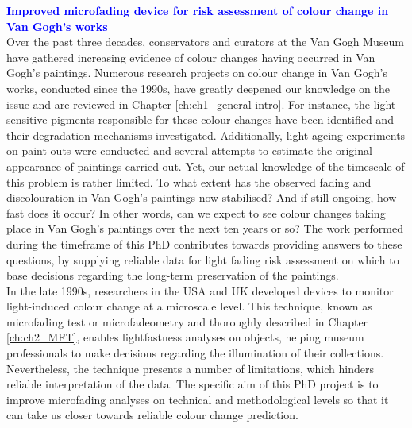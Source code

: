 


\textbf{\textcolor{blue}{Improved microfading device for risk assessment of colour change in Van Gogh's works}}\\

Over the past three decades, conservators and curators at the Van Gogh Museum have gathered increasing evidence of colour changes having occurred in Van Gogh’s paintings. Numerous research projects on colour change in Van Gogh’s works, conducted since the 1990s, have greatly deepened our knowledge on the issue and are reviewed in Chapter \ref{ch:ch1_general-intro}. For instance, the light-sensitive pigments responsible for these colour changes have been identified and their degradation mechanisms investigated. Additionally, light-ageing experiments on paint-outs were conducted and several attempts to estimate the original appearance of paintings carried out. Yet, our actual knowledge of the timescale of this problem is rather limited. To what extent has the observed fading and discolouration in Van Gogh’s paintings now stabilised? And if still ongoing, how fast does it occur? In other words, can we expect to see colour changes taking place in Van Gogh’s paintings over the next ten years or so? The work performed during the timeframe of this PhD contributes towards providing answers to these questions, by supplying reliable data for light fading risk assessment on which to base decisions regarding the long-term preservation of the paintings. \\

In the late 1990s, researchers in the \gls{USA} and \gls{UK} developed devices to monitor light-induced colour change at a microscale level. This technique, known as microfading test or microfadeometry and thoroughly described in Chapter \ref{ch:ch2_MFT}, enables lightfastness analyses on objects, helping museum professionals to make decisions regarding the illumination of their collections. Nevertheless, the technique presents a number of limitations, which hinders reliable interpretation of the data. The specific aim of this PhD project is to improve microfading analyses on technical and methodological levels so that it can take us closer towards reliable colour change prediction. \\ 

